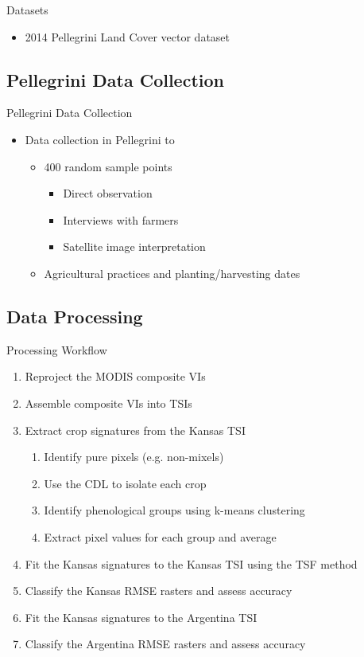 \documentclass[draft,compress]{beamer}
\newcommand{\datenoyear}[2]{%
  \noyear\formatdate{#1}{#2}{1}%
  \aagdate}
\begin{document}
\begin{frame}{Datasets}
\begin{itemize}
  \item<1-> 2014 Pellegrini Land Cover vector dataset
\end{itemize}
\end{frame}


\subsection{Pellegrini Data Collection}
\begin{frame}{Pellegrini Data Collection}
\begin{itemize}
  \item<1-> Data collection in Pellegrini \datenoyear{12}{3} to \datenoyear{3}{4}
  \begin{itemize}
    \item<2-> 400 random sample points
    \begin{itemize}
      \item<3-> Direct observation
      \item<3-> Interviews with farmers
      \item<3-> Satellite image interpretation
    \end{itemize}
    \item<4-> Agricultural practices and planting/harvesting dates
  \end{itemize}
\end{itemize}
\end{frame}


\subsection{Data Processing}
\begin{frame}{Processing Workflow}
\begin{enumerate}
  \item Reproject the MODIS composite VIs
  \item Assemble composite VIs into TSIs
  \item Extract crop signatures from the Kansas TSI
  \begin{enumerate}
    \item Identify pure pixels (e.g. non-mixels)
    \item Use the CDL to isolate each crop
    \item Identify phenological groups using k-means clustering
    \item Extract pixel values for each group and average
  \end{enumerate}
  \item Fit the Kansas signatures to the Kansas TSI using the TSF method
  \item Classify the Kansas RMSE rasters and assess accuracy
  \item Fit the Kansas signatures to the Argentina TSI
  \item Classify the Argentina RMSE rasters and assess accuracy
\end{enumerate}
\end{frame}
\end{document}
